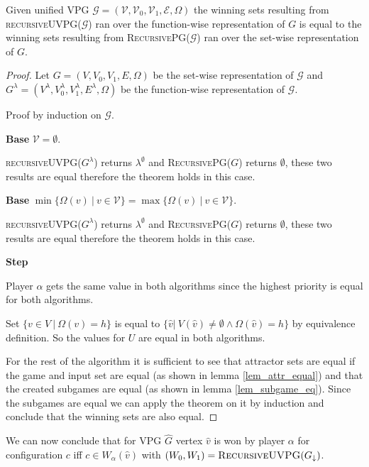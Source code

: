\begin{theorem}
	Given unified VPG $\mathcal{G} = (\mathcal{V},\mathcal{V}_0,\mathcal{V}_1, \mathcal{E}, \Omega)$ the winning sets resulting from \textsc{recursiveUVPG($\mathcal{G}$)} ran over the function-wise representation of $G$ is equal to the winning sets resulting from \textsc{RecursivePG($\mathcal{G}$)} ran over the set-wise representation of $G$.
	\begin{proof}
		Let $G = (V,V_0,V_1,E,\Omega)$ be the set-wise representation of $\mathcal{G}$ and $G^\lambda = (V^\lambda, V^\lambda_0, V^\lambda_1, E^\lambda, \Omega)$ be the function-wise representation of $\mathcal{G}$.
		
		Proof by induction on $\mathcal{G}$.
		
		\textbf{Base} $\mathcal{V} = \emptyset$. 
		
		\textsc{recursiveUVPG($G^\lambda$)} returns $\lambda^\emptyset$ and \textsc{RecursivePG($G$)} returns $\emptyset$, these two results are equal therefore the theorem holds in this case.
		
		\textbf{Base} $\min\{\Omega(v)\ |\ v \in \mathcal{V}\} = \max\{\Omega(v)\ |\ v \in \mathcal{V}\}$.
		
		\textsc{recursiveUVPG($G^\lambda$)} returns $\lambda^\emptyset$ and \textsc{RecursivePG($G$)} returns $\emptyset$, these two results are equal therefore the theorem holds in this case.
		
		\textbf{Step}
		
		Player $\alpha$ gets the same value in both algorithms since the highest priority is equal for both algorithms.
		
		Set $\{v \in V\ |\ \Omega(v) = h\}$ is equal to $\{ \hat{v} |\ V(\hat{v}) \neq \emptyset \wedge \Omega(\hat{v}) = h\}$ by equivalence definition. So the values for $U$ are equal in both algorithms.
		
		For the rest of the algorithm it is sufficient to see that attractor sets are equal if the game and input set are equal (as shown in lemma \ref{lem_attr_equal}) and that the created subgames are equal (as shown in lemma \ref{lem_subgame_eq}). Since the subgames are equal we can apply the theorem on it by induction and conclude that the winning sets are also equal.
	\end{proof}
\end{theorem}

We can now conclude that for VPG $\hat{G}$ vertex $\hat{v}$ is won by player $\alpha$ for configuration $c$ iff $c \in W_\alpha(\hat{v})$ with $(W_0,W_1) = \textsc{RecursiveUVPG}(G_{\downarrow})$.